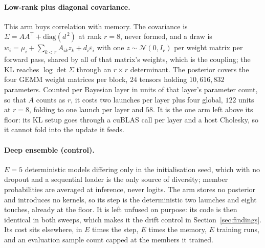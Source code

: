\paragraph{Low-rank plus diagonal covariance.}
This arm buys correlation with memory. The covariance is $\Sigma = A A^{\top} +
\mathrm{diag}(d^{\,2})$ at rank $r = 8$, never formed, and a draw is $w_i = \mu_i +
\sum_{k<r} A_{ik} z_k + d_i \varepsilon_i$ with one $z \sim \mathcal{N}(0, I_r)$ per
weight matrix per forward pass, shared by all of that matrix's weights, which is the
coupling; the KL reaches $\log\det \Sigma$ through an $r \times r$ determinant. The
posterior covers the four GEMM weight matrices per block, $24$ tensors holding
$10{,}616{,}832$ parameters. Counted per Bayesian layer in units of that layer's
parameter count, so that $A$ counts as $r$, it costs two launches per
layer plus four global, $122$ units at $r = 8$, folding to one launch per layer and
$58$. It is the one arm left above its floor: its KL setup goes through a cuBLAS
call per layer and a host Cholesky, so it cannot fold into the update it feeds.

\paragraph{Deep ensemble (control).}
$E = 5$ deterministic models \citep{lakshminarayanan2017simple} differing only in
the initialisation seed, which with no dropout and a sequential loader is the only
source of diversity; member probabilities are averaged at inference, never logits.
The arm stores no posterior and introduces no kernels, so its step is the
deterministic two launches and eight touches, already at the floor. It is left
unfused on purpose: its code is then identical in both sweeps, which makes it the
drift control in Section~\ref{sec:findings}. Its cost sits elsewhere, in $E$ times
the step, $E$ times the memory, $E$ training runs, and an evaluation sample count
capped at the members it trained.
